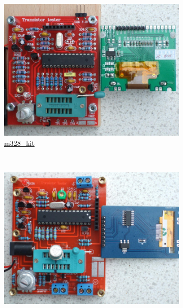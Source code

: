 \documentclass[pdftex,12pt,a4paper,english]{article}
\begin{document}
\vspace{-1em}
\begin{figure}[H]
  \begin{subfigure}[b]{.3\textwidth}
    \centering
    \includegraphics[width=1.\textwidth]{../PNG/Kit_ST7565b.jpg}
	  \\ \vspace{-0.5em}
	  {\href{run:./trunk/mega328_st7565_kit/}{m328\_kit}}
  \end{subfigure}
~
  \begin{subfigure}[b]{.3\textwidth}	%
    \centering
    \includegraphics[width=1.\textwidth]{../PNG/Kit_Color_b.jpg}
	  \\ \vspace{-0.5em}

\end{subfigure}
\end{figure}
\end{document}

